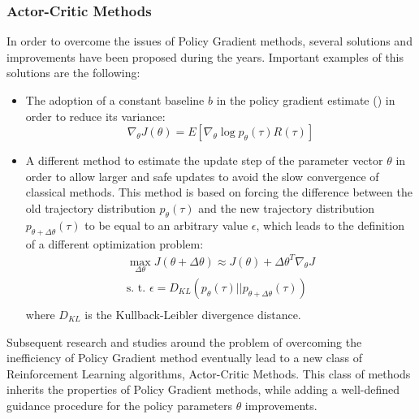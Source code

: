             \subsubsection{Actor-Critic Methods}    
                In order to overcome the issues of Policy Gradient methods, several solutions and improvements have been proposed during the years. Important examples of this solutions are the following:
                \begin{itemize}
                    \item The adoption of a constant baseline $b$ in the policy gradient estimate () in order to reduce its variance:
                    \[ \nabla_{\theta} J(\theta) = E \left[ \nabla_{\theta} \log p_{\theta}(\tau) R(\tau) \right] \]
                    \item  A different method to estimate the update step of the parameter vector $\theta$ in order to allow larger and safe updates to avoid the slow convergence of classical methods. This method is based on forcing the difference between the old trajectory distribution $p_{\theta}(\tau)$ and the new trajectory distribution $p_{\theta + \Delta\theta}(\tau)$ to be equal to an arbitrary value $\epsilon$, which leads to the definition of a different optimization problem:
                    \begin{align*}  
                        \max_{\Delta\theta} J(\theta + \Delta\theta) \approx J (\theta) + \Delta\theta^{T}\nabla_{\theta}J\\
                        \text{s. t. } \epsilon = D_{KL} \left( p_{\theta}(\tau)||p_{\theta + \Delta\theta}(\tau)\right) \\
                    \end{align*}
                    where $D_{KL}$ is the Kullback-Leibler divergence distance.
                \end{itemize}
                Subsequent research and studies around the problem of overcoming the inefficiency of Policy Gradient method eventually lead to a new class of Reinforcement Learning algorithms, Actor-Critic Methods. This class of methods inherits the properties of Policy Gradient methods, while adding a well-defined guidance procedure for the policy parameters $\theta$ improvements. \newline
